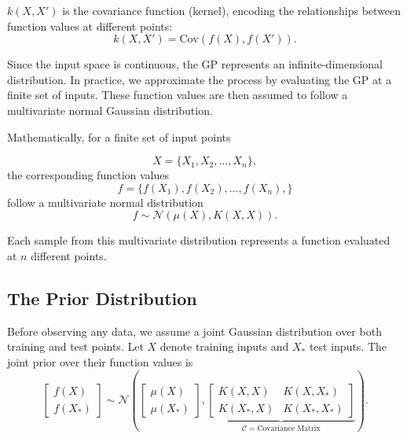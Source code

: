 \documentclass{ucdgradtaughtthesis}
\begin{document}
\noindent
 \( k(X, X') \) is the covariance function (kernel), encoding the relationships between function values at different points:
\begin{equation}
    k(X, X') = \text{Cov}(f(X), f(X')).
    \label{eq: kerneldef}
\end{equation}

\noindent
Since the input space is continuous, the GP represents an infinite-dimensional distribution. 
In practice, we approximate the process by evaluating the GP at a finite set of inputs.
These function values are then assumed to follow a multivariate normal Gaussian distribution.

\noindent
Mathematically, for a finite set of input points

\begin{equation}
X = \{X_1, X_2, \dots, X_n\},
\end{equation}
 the corresponding function values
\begin{equation}
f = \{f(X_1),f(X_2),...,f(X_n), \}
\end{equation}
follow a multivariate normal distribution
\begin{equation}
f \sim \mathcal{N}\left(\mu(X), K(X, X)\right).
\label{eq: Multivariate_distribution}
\end{equation}

\noindent
Each sample from this multivariate distribution represents a function evaluated at \( n \) different points.

\subsection{The Prior Distribution}
\label{sec: prior_dist}

Before observing any data, we assume a joint Gaussian distribution over both training and test points. Let \( X \) denote training inputs and \( X_* \) test inputs. 
The joint prior over their function values is
\begin{equation}
\begin{bmatrix}
f(X) \\
f(X_*)
\end{bmatrix}
\sim \mathcal{N}
\left(
\begin{bmatrix}
\mu(X) \\
\mu(X_*)
\end{bmatrix},
\underbrace{
\begin{bmatrix}
K(X, X) & K(X, X_*) \\
K(X_*, X) & K(X_*, X_*)
\end{bmatrix}
}_{\mathcal{C} = \text{Covariance Matrix}}
\right).
\label{eq: Multivariate prior}
\end{equation}
\end{document}
